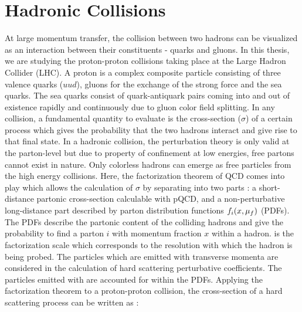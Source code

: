 \section{Hadronic Collisions}
At large momentum transfer, the collision between two hadrons can be visualized as an interaction between their constituents - quarks and gluons. In this thesis, we are studying the proton-proton collisions taking place at the Large Hadron Collider (LHC). A proton is a complex composite particle consisting of three valence quarks ($uud$), gluons for the exchange of the strong force and the sea quarks. The sea quarks consist of quark-antiquark pairs coming into and out of existence rapidly and continuously due to gluon color field splitting. In any collision, a fundamental quantity to evaluate is the cross-section ($\sigma$) of a certain process which gives the probability that the two hadrons interact and give rise to that final state. In a hadronic collision, the perturbation theory is only valid at the parton-level but due to property of confinement at low energies, free partons cannot exist in nature. Only colorless hadrons can emerge as free particles from the high energy collisions. Here, the factorization theorem of QCD \cite{Collins:1989gx} comes into play which allows the calculation of $\sigma$ by separating into two parts : a short-distance partonic cross-section calculable with pQCD, and a non-perturbative long-distance part described by parton distribution functions $f_i(x,\mu_f)$ (PDFs). The PDFs describe the partonic content of the colliding hadrons and give the probability to find a parton $i$ with momentum fraction $x$ within a hadron. \muf is the factorization scale which corresponds to the resolution with which the hadron is being probed. The particles which are emitted with transverse momenta \pt \gr \muf are considered in the calculation of hard scattering perturbative coefficients. The particles emitted with \pt \ls \muf are accounted for within the PDFs. Applying the factorization theorem to a proton-proton collision, the cross-section of a hard scattering process can be written as :

